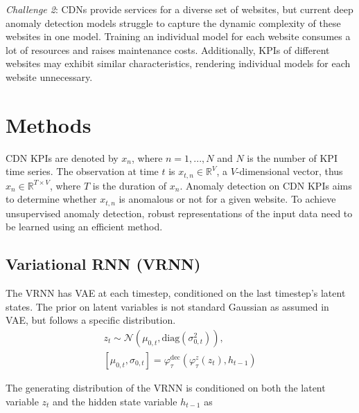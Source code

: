 \documentclass[a0,portrait]{a0poster}
\begin{document}
\begin{multicols}{2}
\begin{center}
\end{center}\vspace{1cm}

\textit{Challenge 2}: CDNs provide services for a diverse set of websites, but current deep anomaly detection models struggle to capture the dynamic complexity of these websites in one model. Training an individual model for each website consumes a lot of resources and raises maintenance costs. Additionally, KPIs of different websites may exhibit similar characteristics, rendering individual models for each website unnecessary.


\section*{Methods}

\quad CDN KPIs are denoted by $x_n$, where $n=1,...,N$ and $N$ is the number of KPI time series. The observation at time $t$ is $x_{t,n}\in \mathbb{R}^V$, a $V$-dimensional vector, thus $x_n\in \mathbb{R}^{T\times V}$, where $T$ is the duration of $x_n$. Anomaly detection on CDN KPIs aims to determine whether $x_{t,n}$ is anomalous or not for a given website. To achieve unsupervised anomaly detection, robust representations of the input data need to be learned using an efficient method.

\subsection*{Variational RNN (VRNN)}

\quad The VRNN\cite{b4} has VAE\cite{b5} at each timestep, conditioned on the last timestep's latent states. The prior on latent variables is not standard Gaussian as assumed in VAE, but follows a specific distribution.
\begin{equation}
	\begin{gathered}
		z_{t} \sim \mathcal{N}\left(\mu_{0,t},\text{diag}(\sigma_{0,t}^{2})\right), \\
		\left[\mu_{0,t},\sigma_{0,t}\right]=\varphi_{\tau}^{\text{dec}}\left(\varphi_{\tau}^z {(z_t)},h_{t-1}\right)
	\end{gathered}
\end{equation}

The generating distribution of the VRNN is conditioned on both the latent variable $z_t$ and the hidden state variable $h_{t-1}$ as


\end{multicols}
\end{document}
